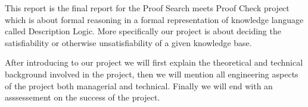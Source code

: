 This report is the final report for the Proof Search meets Proof Check
project which is about formal reasoning in a formal representation
of knowledge language called Description Logic. More specifically our 
project is about deciding the satisfiability or otherwise unsatisfiability
of a given knowledge base.

After introducing to our project we will first explain the theoretical
and technical background involved in the project, then we will mention
all engineering aspects of the project both managerial and
technical. Finally we will end with an asssessement on the success of
the project.
